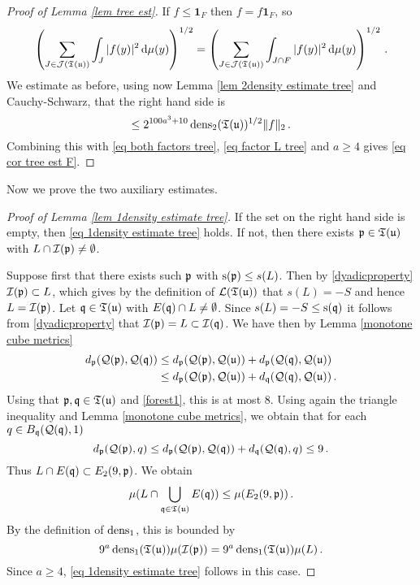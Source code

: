 {\begin{proof}[Proof of Lemma \ref{lem tree est}]
    If $f \le \mathbf{1}_F$ then $f = f\mathbf{1}_F$, so
    $$
        \left( \sum_{J \in \mathcal{J}(\mathfrak T(\mathfrak u))} \int_J |f(y)|^2 \, \mathrm{d}\mu(y) \right)^{1/2} = \left( \sum_{J \in \mathcal{J}(\mathfrak T(\mathfrak u))} \int_{J \cap F} |f(y)|^2 \, \mathrm{d}\mu(y) \right)^{1/2}\,.
    $$
    We estimate as before, using now Lemma \ref{lem 2density estimate tree} and Cauchy-Schwarz, that the right hand side is
    $$
        \le 2^{100a^3 + 10} \operatorname{\operatorname{dens}}_2(\mathfrak T(\mathfrak u))^{1/2} \|f\|_2\,.
    $$
    Combining this with \eqref{eq both factors tree}, \eqref{eq factor L tree} and $a \ge 4$ gives \eqref{eq cor tree est F}.
\end{proof}

Now we prove the two auxiliary estimates.

\begin{proof}[Proof of Lemma \ref{lem 1density estimate tree}]
    If the set on the right hand side is empty, then \eqref{eq 1density estimate tree} holds. If not, then there exists $\mathfrak p \in \mathfrak T(\mathfrak u)$ with $L \cap \mathcal{I}(\mathfrak p) \ne \emptyset$.

    Suppose first that there exists such $\mathfrak p$ with $\mathrm{s}(\mathfrak p) \le s(L)$. Then by \eqref{dyadicproperty} $\mathcal{I}(\mathfrak p) \subset L$, which gives by the definition of $\mathcal{L}(\mathfrak T(\mathfrak u))$ that $s(L) = -S$ and hence $L = \mathcal{I}(\mathfrak p)$. Let $\mathfrak q \in \mathfrak T(\mathfrak u)$ with $E(\mathfrak q) \cap L \ne \emptyset$. Since $s(L) = -S \le \mathrm{s}(\mathfrak q)$ it follows from \eqref{dyadicproperty} that $\mathcal{I}(\mathfrak p) = L \subset \mathcal{I}(\mathfrak q)$. We have then by Lemma \ref{monotone cube metrics}
    \begin{align*}
        d_{\mathfrak p}(\mathcal{Q}(\mathfrak p), \mathcal{Q}(\mathfrak q)) &\le d_{\mathfrak p}(\mathcal{Q}(\mathfrak p), \mathcal{Q}(\mathfrak u)) + d_{\mathfrak p}(\mathcal{Q}(\mathfrak q), \mathcal{Q}(\mathfrak u))\\
        &\le d_{\mathfrak p}(\mathcal{Q}(\mathfrak p), \mathcal{Q}(\mathfrak u)) + d_{\mathfrak q}(\mathcal{Q}(\mathfrak q), \mathcal{Q}(\mathfrak u))\,.
    \end{align*}
    Using that $\mathfrak p, \mathfrak q \in \mathfrak T(\mathfrak u)$ and \eqref{forest1}, this is at most $8$. Using again the triangle inequality and Lemma \ref{monotone cube metrics}, we obtain that for each $q \in B_{\mathfrak q}(\mathcal{Q}(\mathfrak q), 1)$
    $$
        d_{\mathfrak p}(\mathcal{Q}(\mathfrak p), q) \le d_{\mathfrak p}(\mathcal{Q}(\mathfrak p), \mathcal{Q}(\mathfrak q)) + d_{\mathfrak q}(\mathcal{Q}(\mathfrak q), q) \le 9\,.
    $$
    Thus $L \cap E(\mathfrak q) \subset E_2(9, \mathfrak p)$. We obtain
    $$
        \mu(L \cap \bigcup_{\mathfrak q \in \mathfrak T(\mathfrak u)} E(\mathfrak q)) \le \mu(E_2(9, \mathfrak p))\,.
    $$
    By the definition of $\operatorname{\operatorname{dens}}_1$, this is bounded by
    $$
        9^a \operatorname{\operatorname{dens}}_1(\mathfrak T(\mathfrak u)) \mu(\mathcal{I}(\mathfrak p)) =9^a \operatorname{\operatorname{dens}}_1(\mathfrak T(\mathfrak u)) \mu(L)\,.
    $$
    Since $a \ge 4$, \eqref{eq 1density estimate tree} follows in this case.


\end{proof}}
